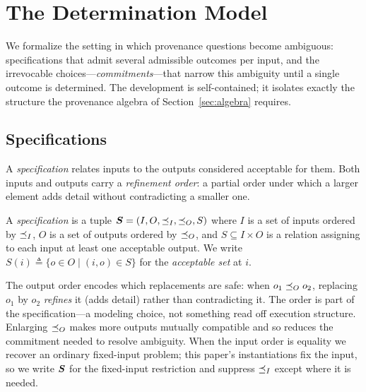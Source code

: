 %
\section{The Determination Model}
\label{sec:prelim}

We formalize the setting in which provenance questions become ambiguous:
specifications that admit several admissible outcomes per input, and the
irrevocable choices---\emph{commitments}---that narrow this ambiguity until a
single outcome is determined. The development is self-contained; it isolates
exactly the structure the provenance algebra of
Section~\ref{sec:algebra} requires.

\subsection{Specifications}

A \emph{specification} relates inputs to the outputs considered acceptable
for them. Both inputs and outputs carry a \emph{refinement order}: a partial
order under which a larger element adds detail without contradicting a
smaller one.

\begin{definition}[Specification]
  \label{def:spec}
  A \emph{specification} is a tuple
  $\boldsymbol{S} = (I, O, \preceq_I, \preceq_O, S)$ where $I$ is a set of inputs ordered by
  $\preceq_I$, $O$ is a set of outputs ordered by $\preceq_O$, and
  $S \subseteq I \times O$ is a relation assigning to each input at least one
  acceptable output. We write $S(i) \triangleq \{o \in O \mid (i,o) \in S\}$
  for the \emph{acceptable set} at $i$.
\end{definition}

\noindent
The output order encodes which replacements are safe: when
$o_1 \preceq_O o_2$, replacing $o_1$ by $o_2$ \emph{refines} it (adds detail)
rather than contradicting it. The order is part of the specification---a
modeling choice, not something read off execution structure. Enlarging
$\preceq_O$ makes more outputs mutually compatible and so reduces the commitment
needed to resolve ambiguity. When the input order is equality we recover an
ordinary fixed-input problem; this paper's instantiations fix the input, so
we write $\boldsymbol{S}$ for the fixed-input restriction and suppress $\preceq_I$ except
where it is needed.

